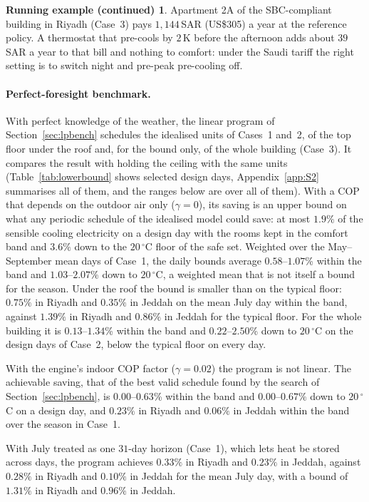 \documentclass[10pt,a4paper,twocolumn]{article}
\theoremstyle{definition}
\newtheorem*{runexc}{Running example (continued)}
\begin{document}
\begin{runexc}
Apartment 2A of the SBC-compliant building in Riyadh (Case~3) pays $1{,}144\,$SAR (US\$305) a year at the reference policy. A thermostat that pre-cools by $2\,$K before the afternoon adds about $39\,$SAR a year to that bill and nothing to comfort: under the Saudi tariff the right setting is to switch night and pre-peak pre-cooling off.
\end{runexc}

\paragraph{Perfect-foresight benchmark.}\label{sec:lowerbound} With perfect knowledge of the weather, the linear program of Section~\ref{sec:lpbench} schedules the idealised units of Cases~1 and~2, of the top floor under the roof and, for the bound only, of the whole building (Case~3). It compares the result with holding the ceiling with the same units (Table~\ref{tab:lowerbound} shows selected design days, Appendix~\ref{app:S2} summarises all of them, and the ranges below are over all of them). With a COP that depends on the outdoor air only ($\gamma=0$), its saving is an upper bound on what any periodic schedule of the idealised model could save: at most $1.9\%$ of the sensible cooling electricity on a design day with the rooms kept in the comfort band and $3.6\%$ down to the $20\,^{\circ}$C floor of the safe set. Weighted over the May--September mean days of Case~1, the daily bounds average $0.58$--$1.07$\% within the band and $1.03$--$2.07$\% down to $20\,^{\circ}$C, a weighted mean that is not itself a bound for the season. Under the roof the bound is smaller than on the typical floor: $0.75\%$ in Riyadh and $0.35\%$ in Jeddah on the mean July day within the band, against $1.39\%$ in Riyadh and $0.86\%$ in Jeddah for the typical floor. For the whole building it is $0.13$--$1.34$\% within the band and $0.22$--$2.50$\% down to $20\,^{\circ}$C on the design days of Case~2, below the typical floor on every day.

With the engine's indoor COP factor ($\gamma=0.02$) the program is not linear. The achievable saving, that of the best valid schedule found by the search of Section~\ref{sec:lpbench}, is $0.00$--$0.63$\% within the band and $0.00$--$0.67$\% down to $20\,^{\circ}$C on a design day, and $0.23\%$ in Riyadh and $0.06\%$ in Jeddah within the band over the season in Case~1.

With July treated as one $31$-day horizon (Case~1), which lets heat be stored across days, the program achieves $0.33\%$ in Riyadh and $0.23\%$ in Jeddah, against $0.28\%$ in Riyadh and $0.10\%$ in Jeddah for the mean July day, with a bound of $1.31\%$ in Riyadh and $0.96\%$ in Jeddah.
\end{document}
